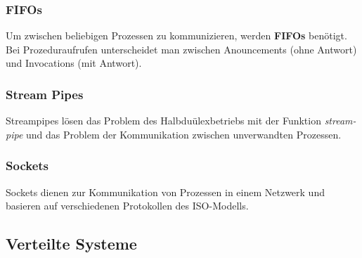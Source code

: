 \documentclass{article}
\begin{document}
\subsubsection{FIFOs}
    Um zwischen beliebigen Prozessen zu kommunizieren, werden \textbf{FIFOs} benötigt. Bei Prozeduraufrufen unterscheidet man zwischen Anouncements (ohne Antwort) und Invocations (mit Antwort). 
\subsubsection{Stream Pipes}
    Streampipes lösen das Problem des Halbduülexbetriebs mit der Funktion \textit{stream-pipe} und das Problem der Kommunikation zwischen unverwandten Prozessen. 
\subsubsection{Sockets}
    Sockets dienen zur Kommunikation von Prozessen in einem Netzwerk und basieren auf verschiedenen Protokollen des ISO-Modells.
\subsection{Verteilte Systeme}
\end{document}
